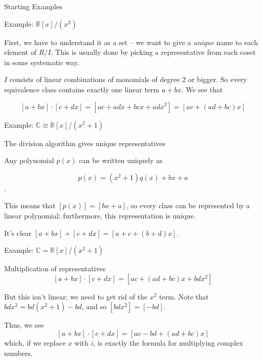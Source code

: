 \documentclass{beamer}
\newcommand{\C}{\mathbb{C}}
\newcommand{\R}{\mathbb{R}}
\begin{document}
\begin{frame}[plain,c]

\begin{center}

\Huge

Starting Examples
\end{center}

\end{frame}

\begin{frame}{Example: $\R[x]/(x^2)$}

First, we have to understand it as a set -- we want to give a \emph{unique} name to each element of $R/I$.  This is usually done by picking a representative from each coset in some systematic way.

$I$ consists of linear combinations of monomials of degree 2 or bigger.  So every equivalence class contains exactly one linear term $a+bx$.  We see that 

$$[a+bx]\cdot [c+dx]=[ac+adx+bcx+adx^2]=[ac+(ad+bc)x]$$


\end{frame}


\begin{frame}{Example: $\C\cong\R[x]/(x^2+1)$}

\begin{block}{The division algorithm gives unique representatives}

Any polynomial $p(x)$ can be written uniquely as

 $$p(x)=(x^2+1)q(x)+bx+a$$. 

This means that $[p(x)]=[bx+a]$, so every class can be represented by a linear polynomial; furthermore, this representation is unique.
\end{block}

It's clear $[a+bx]+[c+dx]=[a+c+(b+d)x]$.
\end{frame}

\begin{frame}{Example: $\mathbb{C}=\R[x]/(x^2+1)$}

\begin{block}{Multiplication of representatives}
$$[a+bx]\cdot [c+dx]=[ac+(ad+bc)x+bdx^2]$$

But this isn't linear;  we need to get rid of the $x^2$ term.  Note that $bdx^2=bd(x^2+1)-bd$, and so $[bdx^2]=[-bd]$.

Thus, we see
$$[a+bx]\cdot [c+dx]=[ac-bd+(ad+bc)x]$$
which, if we replace $x$ with $i$, is exactly the formula for multiplying complex numbers.
\end{block}


\end{frame}
\end{document}
